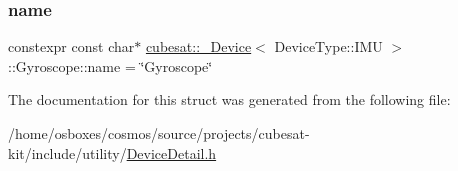 \subsubsection{\texorpdfstring{name}{name}}
{\footnotesize\ttfamily constexpr const char$\ast$ \hyperlink{structcubesat_1_1__Device}{cubesat\+::\+\_\+\+Device}$<$ Device\+Type\+::\+I\+MU $>$\+::Gyroscope\+::name = \char`\"{}Gyroscope\char`\"{}\hspace{0.3cm}{\ttfamily [static]}}



The documentation for this struct was generated from the following file\+:\begin{DoxyCompactItemize}
\item 
/home/osboxes/cosmos/source/projects/cubesat-\/kit/include/utility/\hyperlink{DeviceDetail_8h}{Device\+Detail.\+h}\end{DoxyCompactItemize}
